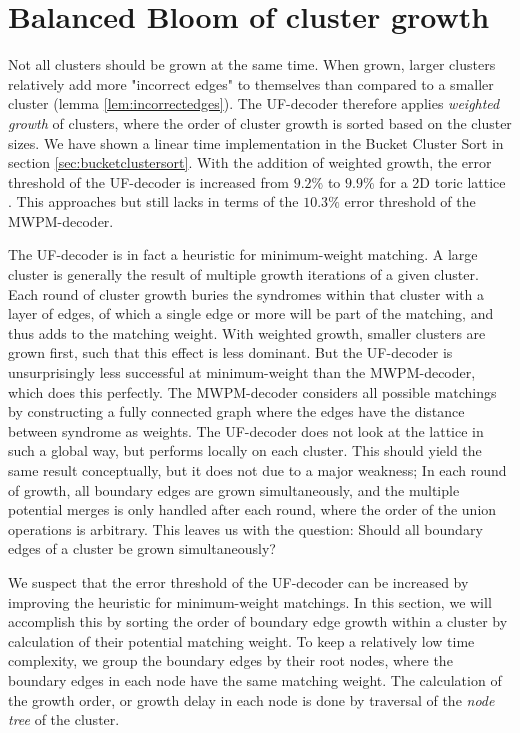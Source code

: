 \section{Balanced Bloom of cluster growth}

Not all clusters should be grown at the same time. When grown, larger clusters relatively add more "incorrect edges" to themselves than compared to a smaller cluster (lemma \ref{lem:incorrectedges}). The UF-decoder therefore applies \emph{weighted growth} of clusters, where the order of cluster growth is sorted based on the cluster sizes. We have shown a linear time implementation in the Bucket Cluster Sort in section \ref{sec:bucketclustersort}. With the addition of weighted growth, the error threshold of the UF-decoder is increased from $9.2\%$ to $9.9\%$ for a 2D toric lattice \cite{delfosse2017almost}. This approaches but still lacks in terms of the $10.3\%$ error threshold of the MWPM-decoder.

The UF-decoder is in fact a heuristic for minimum-weight matching. A large cluster is generally the result of multiple growth iterations of a given cluster. Each round of cluster growth buries the syndromes within that cluster with a layer of edges, of which a single edge or more will be part of the matching, and thus adds to the matching weight. With weighted growth, smaller clusters are grown first, such that this effect is less dominant. But the UF-decoder is unsurprisingly less successful at minimum-weight than the MWPM-decoder, which does this perfectly. The MWPM-decoder considers all possible matchings by constructing a fully connected graph where the edges have the distance between syndrome as weights. The UF-decoder does not look at the lattice in such a global way, but performs locally on each cluster. This should yield the same result conceptually, but it does not due to a major weakness; In each round of growth, all boundary edges are grown simultaneously, and the multiple potential merges is only handled after each round, where the order of the union operations is arbitrary. This leaves us with the question: Should all boundary edges of a cluster be grown simultaneously?

We suspect that the error threshold of the UF-decoder can be increased by improving the heuristic for minimum-weight matchings. In this section, we will accomplish this by sorting the order of boundary edge growth within a cluster by calculation of their potential matching weight. To keep a relatively low time complexity, we group the boundary edges by their root nodes, where the boundary edges in each node have the same matching weight. The calculation of the growth order, or growth delay in each node is done by traversal of the \emph{node tree} of the cluster.



